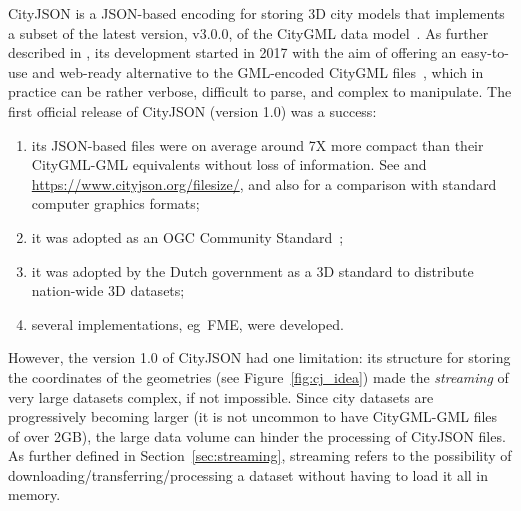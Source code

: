 \documentclass{isprs} %
\newcommand{\eg}{eg}
\begin{document}
CityJSON is a JSON-based encoding for storing 3D city models that implements a subset of the latest version, v3.0.0, of the CityGML data model~\citep{OGC-CityGML3}.
As further described in \citet{19_ogdss_cityjson}, its development started in 2017 with the aim of offering an easy-to-use and web-ready alternative to the GML-encoded CityGML files~\citep{OGC-CityGML3-XML}, which in practice can be rather verbose, difficult to parse, and complex to manipulate.
The first official release of CityJSON (version 1.0) was a success: 
\begin{enumerate}
  \item its JSON-based files were on average around 7X more compact than their CityGML-GML equivalents without loss of information. See \citet{19_ogdss_cityjson} and \url{https://www.cityjson.org/filesize/}, and also \citet{Praschl23} for a comparison with standard computer graphics formats; 
  \item it was adopted as an OGC Community Standard~\citep{OGC-CityJSON-v10}; 
  \item it was adopted by the Dutch government as a 3D standard to distribute nation-wide 3D datasets; 
  \item several implementations, \eg\ FME, were developed.
\end{enumerate}


%

However, the version 1.0 of CityJSON had one limitation: its structure for storing the coordinates of the geometries (see Figure~\ref{fig:cj_idea}) made the \emph{streaming} of very large datasets complex, if not impossible.
Since city datasets are progressively becoming larger (it is not uncommon to have CityGML-GML files of over 2GB), the large data volume can hinder the processing of CityJSON files.
As further defined in Section~\ref{sec:streaming}, streaming refers to the possibility of downloading/transferring/processing a dataset without having to load it all in memory.

%
\end{document}
